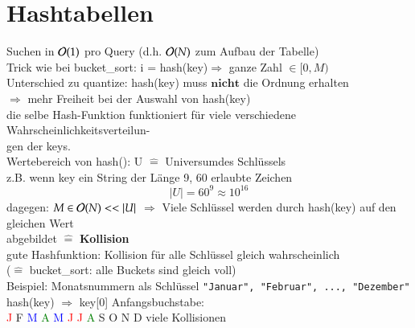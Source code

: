 
\chapter{Hashtabellen}
Suchen in $\mathcal{O}{}(1)$ pro Query (d.h. $\mathcal{O}{}(N)$ zum Aufbau der Tabelle) \\

Trick wie bei bucket\_sort: i = hash(key)$\Rightarrow$ ganze Zahl $\in [0,M)$ \\
\hspace*{5mm} Unterschied zu quantize: hash(key) muss $\textbf{nicht}$ die Ordnung erhalten\\
\hspace*{10mm} $\Rightarrow$ mehr Freiheit bei der Auswahl von hash(key)\\
\hspace*{15mm} die selbe Hash-Funktion funktioniert für viele verschiedene Wahrscheinlichkeitsverteilun- \\
\hspace*{15mm} gen der keys.\\

Wertebereich von hash(): U $\widehat{=}$ \glqq Universum\grqq des Schlüssels \\
\hspace*{5mm} z.B. wenn key ein String der Länge 9, 60 erlaubte Zeichen \\
\[ |U| = 60^9 \approx 10^{16}\]
dagegen: $M \in \mathcal{O}{}(N) << |U|$ $\Rightarrow$ Viele Schlüssel werden durch hash(key) auf den gleichen Wert\\
\hspace*{15mm} abgebildet $\widehat{=}$ \textbf{Kollision}\\
gute Hashfunktion: Kollision für alle Schlüssel gleich wahrscheinlich \\
\hspace*{15mm} ($\widehat{=}$ bucket\_sort: alle Buckets sind gleich voll) \\

Beispiel: Monatsnummern als Schlüssel \verb|"Januar", "Februar", ..., "Dezember"| \\
hash(key) $\Rightarrow$ key[0] Anfangsbuchstabe: \\

\hspace*{10mm} \textcolor{red}{J} \hspace*{5mm}  F \hspace*{5mm}  \textcolor{blue}{M} \hspace*{5mm}  \textcolor{green}{A} \hspace*{5mm}  \textcolor{blue}{M} \hspace*{5mm}  \textcolor{red}{J} \hspace*{5mm}  \textcolor{red}{J} \hspace*{5mm}  \textcolor{green}{A} \hspace*{5mm}
 S \hspace*{5mm}  O \hspace*{5mm}  N \hspace*{5mm}  D \hspace*{10mm} viele Kollisionen \\

